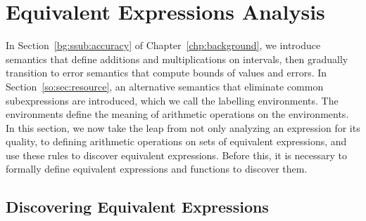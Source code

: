 \section{Equivalent Expressions Analysis}
\label{so:sec:equivalent}

In Section~\ref{bg:ssub:accuracy} of Chapter~\ref{chp:background}, we introduce
semantics that define additions and multiplications on intervals, then
gradually transition to error semantics that compute bounds of values and
errors.  In Section~\ref{so:sec:resource}, an alternative semantics that
eliminate common subexpressions are introduced, which we call the labelling
environments.  The environments define the meaning of arithmetic operations
on the environments.  In this section, we now take the leap from not only
analyzing an expression for its quality, to defining arithmetic operations on
sets of equivalent expressions, and use these rules to discover equivalent
expressions.  Before this, it is necessary to formally define equivalent
expressions and functions to discover them.


\subsection{Discovering Equivalent Expressions}
\label{so:sub:equivalent_relations}

